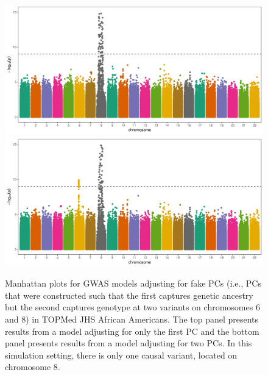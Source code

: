 \documentclass[12pt]{article}
\begin{document}
\begin{figure}[!htb]
\centering
\includegraphics[width=\textwidth]{figs/finalfigs/figS12a_beta2_1pcs_fake_manh}
\includegraphics[width=\textwidth]{figs/finalfigs/figS12b_beta2_2pcs_fake_manh}
\caption[Manhattan plots for GWAS models adjusting for fake PCs in TOPMed JHS.]{Manhattan plots for GWAS models adjusting for fake PCs (i.e., PCs that were constructed such that the first captures genetic ancestry but the second captures genotype at two variants on chromosomes 6 and 8) in TOPMed JHS African Americans. The top panel presents results from a model adjusting for only the first PC and the bottom panel presents results from a model adjusting for two PCs. In this simulation setting, there is only one causal variant, located on chromosome 8.}
\label{fig:manh-fake}
\end{figure}
\end{document}
